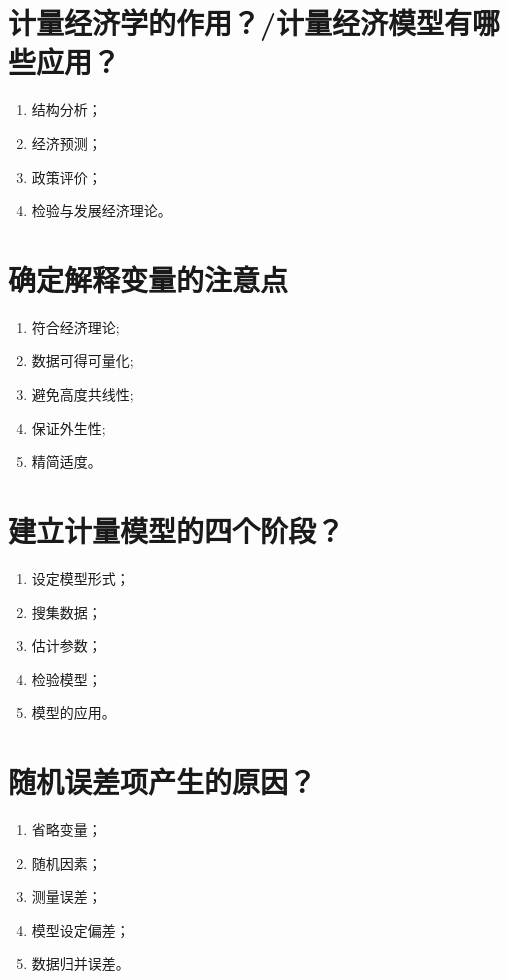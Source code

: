 \documentclass{ctexart}
\begin{document}
\tableofcontents
\newpage

\section{计量经济学的作用？/计量经济模型有哪些应用？}
\begin{enumerate}
\item 结构分析；
\item 经济预测；
\item 政策评价；
\item 检验与发展经济理论。
\end{enumerate}

\section{确定解释变量的注意点}
\begin{enumerate}
\item 符合经济理论;

\item 数据可得可量化;

\item 避免高度共线性;

\item 保证外生性;

\item 精简适度。
\end{enumerate}

\section{建立计量模型的四个阶段？}
\begin{enumerate}
\item 设定模型形式；
\item 搜集数据；
\item 估计参数；
\item 检验模型；
\item 模型的应用。
\end{enumerate}

\section{随机误差项产生的原因？}
\begin{enumerate}
\item 省略变量；
\item 随机因素；
\item 测量误差；
\item 模型设定偏差；
\item 数据归并误差。
\end{enumerate}
\end{document}
